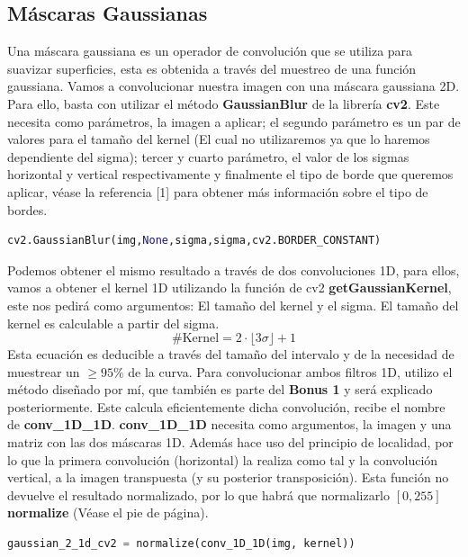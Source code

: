\documentclass{article}
\begin{document}
\subsection{Máscaras Gaussianas}
Una máscara gaussiana es un operador de convolución que se utiliza para suavizar superficies, esta es obtenida a través del muestreo de una función gaussiana.
\newline
\newline
Vamos a convolucionar nuestra imagen con una máscara gaussiana 2D. Para ello, basta con utilizar el método \textbf{GaussianBlur} de la librería \textbf{cv2}.
\newline
\newline
Este necesita como parámetros, la imagen a aplicar; el segundo parámetro es un par de valores para el tamaño del kernel (El cual no utilizaremos ya que lo haremos dependiente del sigma); tercer y cuarto parámetro, el valor de los sigmas horizontal y vertical respectivamente y finalmente el tipo de borde que queremos aplicar, véase la referencia [1] para obtener más información sobre el tipo de bordes.
\begin{lstlisting}[language=Python]
cv2.GaussianBlur(img,None,sigma,sigma,cv2.BORDER_CONSTANT)
\end{lstlisting}
Podemos obtener el mismo resultado a través de dos convoluciones 1D, para ellos, vamos a obtener el kernel 1D utilizando la función de cv2 \textbf{getGaussianKernel}, este nos pedirá como argumentos: El tamaño del kernel y el sigma.
El tamaño del kernel es calculable a partir del sigma.
$$ \#\text{Kernel} = 2\cdot\lfloor{3\sigma}\rfloor + 1$$ 
Esta ecuación es deducible a través del tamaño del intervalo y de la necesidad de muestrear un $\ge 95\%$ de la curva. 
\newline\newline
Para convolucionar ambos filtros 1D, utilizo el método diseñado por mí, que también es parte del \textbf{Bonus 1} y será explicado posteriormente. Este calcula eficientemente dicha convolución, recibe el nombre de \textbf{conv\_1D\_1D}. \textbf{conv\_1D\_1D} necesita como argumentos, la imagen y una matriz con las dos máscaras 1D. Además hace uso del principio de localidad, por lo que la primera convolución (horizontal) la realiza como tal y la convolución vertical, a la imagen transpuesta (y su posterior transposición). Esta función no devuelve el resultado normalizado, por lo que habrá que normalizarlo $\left[0, 255\right]$ \textbf{normalize} (Véase el pie de página).
\begin{lstlisting}[language=Python]
gaussian_2_1d_cv2 = normalize(conv_1D_1D(img, kernel))
\end{lstlisting}
\end{document}
